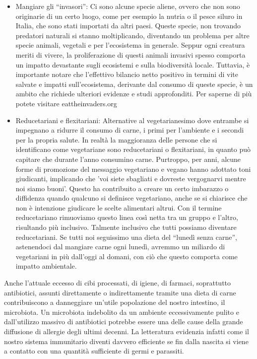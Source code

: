 \documentclass[12pt]{book} %
\begin{document}
\begin{itemize}
\item Mangiare gli “invasori”: Ci sono alcune specie aliene, ovvero che non sono originarie di un certo luogo, come
per esempio la nutria o il pesce siluro in Italia, che sono stati importati da altri paesi. Queste specie, non
trovando predatori naturali si stanno moltiplicando, diventando un problema per altre specie animali, vegetali e
per l'ecosistema in generale. Seppur ogni creatura meriti di vivere, la proliferazione di questi animali invasivi spesso comporta un impatto devastante sugli ecosistemi e sulla biodiversità locale. Tuttavia, è importante notare che l'effettivo bilancio netto positivo in termini di vite salvate e impatti sull'ecosistema, derivante dal consumo di queste specie, è un ambito che richiede ulteriori evidenze e studi approfonditi. Per saperne di più potete visitare eattheinvaders.org
\item Reducetariani e flexitariani: Alternative al vegetarianesimo dove entrambe si impegnano a ridurre il consumo di carne, i primi per l'ambiente e i secondi per la propria salute. In realtà la maggioranza delle persone che si identificano come vegetariane sono reducetariani o flexitariani, in quanto può capitare che durante l'anno consumino carne. Purtroppo, per anni, alcune forme di promozione del messaggio vegetariano e vegano hanno adottato toni giudicanti, implicando che 'voi siete sbagliati e dovreste vergognarvi mentre noi siamo buoni'. Questo ha contribuito a creare un certo imbarazzo o diffidenza quando qualcuno si definisce vegetariano, anche se si chiarisce che non è intenzione giudicare le scelte alimentari altrui. Con il termine reducetariano rimuoviamo questo
linea così netta tra un gruppo e l'altro, risultando più inclusivo. Talmente inclusivo che tutti
possiamo diventare reducetariani. Se tutti noi seguissimo una dieta del “lunedì senza carne”, astenendoci dal mangiare
carne ogni lunedì, avremmo un miliardo di vegetariani in più dall'oggi al domani, con ciò che questo comporta come impatto ambientale.
\end{itemize}

\begin{mdframed}[linewidth=1pt]
Anche l'attuale eccesso di cibi processati, di igiene, di farmaci, soprattutto antibiotici, assunti
direttamente o indirettamente tramite una dieta di carne contribuiscono a danneggiare un'utile popolazione
del nostro intestino, il microbiota. Un microbiota indebolito da un ambiente eccessivamente pulito e
dall'utilizzo massivo di antibiotici potrebbe essere una delle cause della grande diffusione di
allergie degli ultimi decenni. La letteratura evidenzia infatti come il nostro sistema immunitario diventi davvero
efficiente se fin dalla nascita si viene a contatto con una quantità sufficiente di germi e parassiti. 
\end{mdframed}
\end{document}
